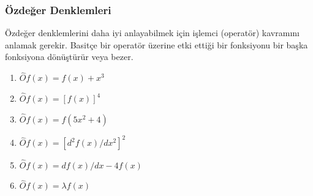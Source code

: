 \documentclass[a4paper,12pt, twoside]{article}
\begin{document}
\subsubsection{Özdeğer Denklemleri}

Özdeğer denklemlerini daha iyi anlayabilmek için işlemci (operatör) kavramını anlamak gerekir. Basitçe bir operatör üzerine etki ettiği bir fonksiyonu bir başka fonksiyona dönüştürür veya bezer. 
\begin{center}
\begin{minipage}{.5\textwidth}
\begin{enumerate}[itemsep=1pt]
\item $\hat O f ( x ) = f ( x ) + x ^ { 3 }  $ 
\item $\hat O f ( x ) = [ f ( x ) ] ^ { 4 }  $ 
\item $\hat O f ( x ) = f ( 5 x^2 + 4 )  $ 
\item $\hat O f ( x ) = [ d^2 f ( x ) / d x^2 ] ^ { 2 }  $
\item $\hat O f ( x ) = d f ( x ) / d x - 4 f ( x )  $
\item $\hat O f ( x ) = \lambda f ( x )$
\end{enumerate}
\end{minipage}
\end{center}
\end{document}
